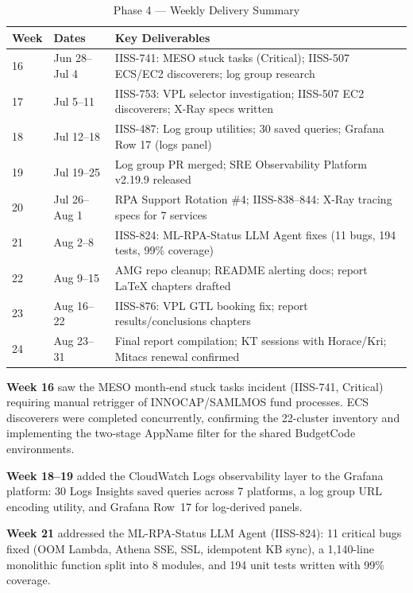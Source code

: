 \begin{table}[ht]
\centering
\caption{Phase 4 --- Weekly Delivery Summary}
\label{tab:wb_phase4}
\begin{tabular}{p{1.2cm}p{4.0cm}p{7.5cm}}
\toprule
\textbf{Week} & \textbf{Dates} & \textbf{Key Deliverables} \\
\midrule
16 & Jun 28--Jul 4 & IISS-741: MESO stuck tasks (Critical); IISS-507 ECS/EC2 discoverers; log group research \\
17 & Jul 5--11 & IISS-753: VPL selector investigation; IISS-507 EC2 discoverers; X-Ray specs written \\
18 & Jul 12--18 & IISS-487: Log group utilities; 30 saved queries; Grafana Row 17 (logs panel) \\
19 & Jul 19--25 & Log group PR merged; SRE Observability Platform v2.19.9 released \\
20 & Jul 26--Aug 1 & RPA Support Rotation \#4; IISS-838--844: X-Ray tracing specs for 7 services \\
21 & Aug 2--8 & IISS-824: ML-RPA-Status LLM Agent fixes (11 bugs, 194 tests, 99\% coverage) \\
22 & Aug 9--15 & AMG repo cleanup; README alerting docs; report LaTeX chapters drafted \\
23 & Aug 16--22 & IISS-876: VPL GTL booking fix; report results/conclusions chapters \\
24 & Aug 23--31 & Final report compilation; KT sessions with Horace/Kri; Mitacs renewal confirmed \\
\bottomrule
\end{tabular}
\end{table}

\textbf{Week 16} saw the MESO month-end stuck tasks incident (IISS-741,
Critical) requiring manual retrigger of INNOCAP/SAMLMOS fund processes. ECS
discoverers were completed concurrently, confirming the 22-cluster inventory
and implementing the two-stage AppName filter for the shared BudgetCode environments.

\textbf{Week 18--19} added the CloudWatch Logs observability layer to the
Grafana platform: 30 Logs Insights saved queries across 7 platforms, a
log group URL encoding utility, and Grafana Row~17 for log-derived panels.

\textbf{Week 21} addressed the ML-RPA-Status LLM Agent (IISS-824):
11 critical bugs fixed (OOM Lambda, Athena SSE, SSL, idempotent KB sync),
a 1,140-line monolithic function split into 8 modules, and 194 unit tests
written with 99\% coverage.

